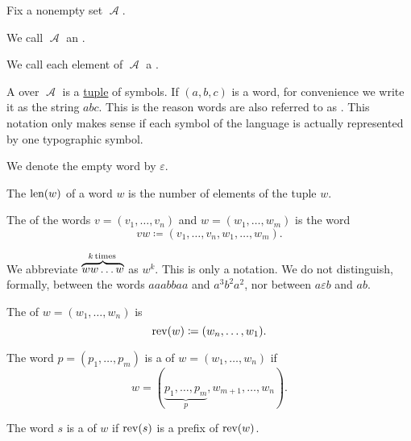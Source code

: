 \begin{definition}\label{def:language}
  Fix a nonempty set \( \mscrA \).

  \begin{thmenum}
     We call \( \mscrA \) an .

     We call each element of \( \mscrA \) a .

     A  over \( \mscrA \) is a \hyperref[def:cartesian_product]{tuple} of symbols. If \( (a, b, c) \) is a word, for convenience we write it as the string \( abc \). This is the reason words are also referred to as . This notation only makes sense if each symbol of the language is actually represented by one typographic symbol.

     We denote the empty word by \( \varepsilon \).

     The  \( \operatorname{len}(w) \) of a word \( w \) is the number of elements of the tuple \( w \).

     The  of the words \( v = (v_1, \ldots, v_n) \) and \( w = (w_1, \ldots, w_m) \) is the word
    \begin{equation*}
      vw \coloneqq (v_1, \ldots, v_n, w_1, \ldots, w_m).
    \end{equation*}

    We abbreviate \( \overbrace{w w \ldots w}^{k \T{times}} \) as \( w^k \). This is only a notation. We do not distinguish, formally, between the words \( aaabbaa \) and \( a^3 b^2 a^2 \), nor between \( a \varepsilon b \) and \( ab \).

     The  of \( w = (w_1, \ldots, w_n) \) is
    \begin{equation*}
      \operatorname{rev}(w) \coloneqq (w_n, \ldots, w_1).
    \end{equation*}

     The word \( p = (p_1, \ldots, p_m) \) is a  of \( w = (w_1, \ldots, w_n) \) if
    \begin{equation*}
      w = (\underbrace{p_1, \ldots, p_m}_p, w_{m+1}, \ldots, w_n).
    \end{equation*}

     The word \( s \) is a  of \( w \) if \( \operatorname{rev}(s) \) is a prefix of \( \operatorname{rev}(w) \).


\end{thmenum}
\end{definition}
